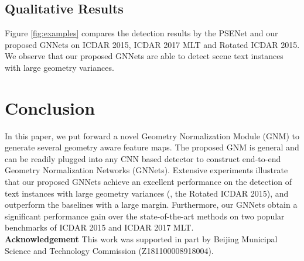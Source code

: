 \documentclass[10pt,twocolumn,letterpaper]{article}
\begin{document}
\subsection{Qualitative Results}\label{Sec:Examples}
Figure \ref{fig:examples} compares the detection results by the PSENet and our proposed GNNets on  ICDAR 2015, ICDAR 2017 MLT and Rotated ICDAR 2015. We observe that our proposed GNNets are able to detect scene text instances with large geometry variances.



\section{Conclusion}
In this paper, we put forward a novel Geometry Normalization Module (GNM) to generate several geometry aware feature maps. The proposed GNM is general and can be readily plugged into any CNN based detector to construct end-to-end Geometry Normalization Networks (GNNets). Extensive experiments illustrate that our proposed GNNets achieve an excellent performance on the detection of text instances with large geometry variances (\eg, the Rotated ICDAR 2015), and outperform the baselines with a large margin. Furthermore, our GNNets obtain a significant performance gain over the state-of-the-art methods on two popular benchmarks of ICDAR 2015 and ICDAR 2017 MLT.
\\\textbf{Acknowledgement} This work was supported in part by Beijing Municipal Science and Technology Commission (Z181100008918004).







{\small


}
\end{document}
